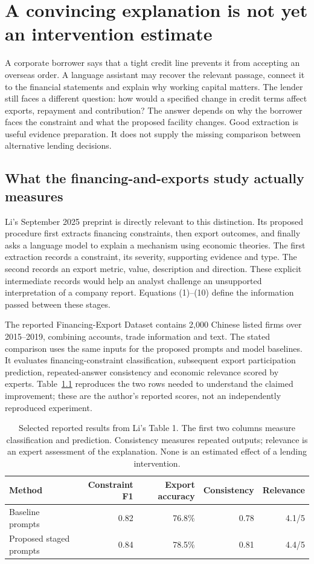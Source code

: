 \chapter{A convincing explanation is not yet an intervention estimate}
\label{closure30:formulation}

A corporate borrower says that a tight credit line prevents it from accepting
an overseas order. A language assistant may recover the relevant passage,
connect it to the financial statements and explain why working capital matters.
The lender still faces a different question: how would a specified change in
credit terms affect exports, repayment and contribution? The answer depends on
why the borrower faces the constraint and what the proposed facility changes.
Good extraction is useful evidence preparation. It does not supply the missing
comparison between alternative lending decisions.

\section{What the financing-and-exports study actually measures}

Li's September 2025 preprint is directly relevant to this distinction. Its
proposed procedure first extracts financing constraints, then export outcomes,
and finally asks a language model to explain a mechanism using economic
theories. The first extraction records a constraint, its severity, supporting
evidence and type. The second records an export metric, value, description and
direction. These explicit intermediate records would help an analyst challenge
an unsupported interpretation of a company report. Equations (1)--(10) define
the information passed between these stages. \citep[Sections 3.1--3.4]{closure30li}

The reported Financing-Export Dataset contains 2,000 Chinese listed firms
over 2015--2019, combining accounts, trade information and text. The stated
comparison uses the same inputs for the proposed prompts and model baselines.
It evaluates financing-constraint classification, subsequent export
participation prediction, repeated-answer consistency and economic relevance
scored by experts. Table~\ref{closure30:exports} reproduces the two rows needed
to understand the claimed improvement; these are the author's reported
scores, not an independently reproduced experiment.

\begin{table}[htbp]
\centering\small
\begin{tabular}{lrrrr}
\toprule
Method & Constraint F1 & Export accuracy & Consistency & Relevance\\
\midrule
Baseline prompts & 0.82 & 76.8\% & 0.78 & 4.1/5\\
Proposed staged prompts & 0.84 & 78.5\% & 0.81 & 4.4/5\\
\bottomrule
\end{tabular}
\caption{Selected reported results from Li's Table 1. The first two columns
measure classification and prediction. Consistency measures repeated outputs;
relevance is an expert assessment of the explanation. None is an estimated
effect of a lending intervention.}
\label{closure30:exports}
\end{table}

